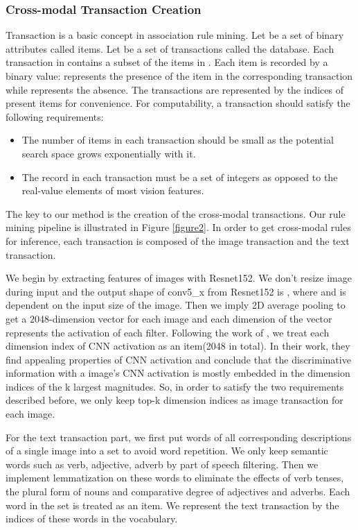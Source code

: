 \documentclass[sigconf]{acmart}
\begin{document}
\subsubsection{Cross-modal Transaction Creation}
 Transaction is a basic concept in association rule mining. Let  be a set of  binary attributes called items. Let  be a set of transactions called the database. Each transaction in  contains a subset of the items in . Each item is recorded by a binary value:  represents the presence of the item in the corresponding transaction while  represents the absence. The transactions are represented by the indices of present items for convenience.
 For computability, a transaction should satisfy the following requirements:
\begin{itemize}
    \item The number of items in each transaction should be small as the potential search space grows exponentially with it.
    \item The record in each transaction must be a set of integers as opposed to the real-value elements of most vision features.
\end{itemize}


The key to our method is the creation of the cross-modal transactions. Our rule mining pipeline is illustrated in Figure \ref{figure2}. In order to get cross-modal rules for inference, each transaction is composed of the image transaction and the text transaction. 

We begin by extracting features of images with Resnet152\cite{he2016deep}. We don't resize image during input and the output shape of conv5\_x from Resnet152 is , where  and  is dependent on the input size of the image. Then we imply 2D average pooling to get a 2048-dimension vector for each image and each dimension of the vector represents the activation of each filter. Following the work of \cite{li2015mid}, we treat each dimension index of CNN activation as an item(2048 in total). In their work, they find appealing properties of CNN activation and conclude that the discriminative information with a image's CNN activation is mostly embedded in the dimension indices of the k largest magnitudes. So, in order to satisfy the two requirements described before, we only keep top-k dimension indices as image transaction for each image.

For the text transaction part, we first put words of all corresponding descriptions of a single image into a set to avoid word repetition. We only keep semantic words such as verb, adjective, adverb by part of speech filtering. Then we implement lemmatization on these words to eliminate the effects of verb tenses, the plural form of nouns and comparative degree of adjectives and adverbs. Each word in the set is treated as an item. We represent the text transaction by the indices of these words in the vocabulary.
\end{document}
